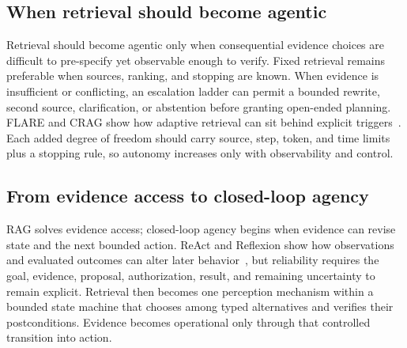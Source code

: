 \subsection{When retrieval should become agentic}

Retrieval should become agentic only when consequential evidence choices are difficult to pre-specify yet observable enough to verify. Fixed retrieval remains preferable when sources, ranking, and stopping are known. When evidence is insufficient or conflicting, an escalation ladder can permit a bounded rewrite, second source, clarification, or abstention before granting open-ended planning. FLARE and CRAG show how adaptive retrieval can sit behind explicit triggers~\cite{jiang2023flare,yan2024crag}. Each added degree of freedom should carry source, step, token, and time limits plus a stopping rule, so autonomy increases only with observability and control.

\subsection{From evidence access to closed-loop agency}

RAG solves evidence access; closed-loop agency begins when evidence can revise state and the next bounded action. ReAct and Reflexion show how observations and evaluated outcomes can alter later behavior~\cite{yao2023react,shinn2023reflexion}, but reliability requires the goal, evidence, proposal, authorization, result, and remaining uncertainty to remain explicit. Retrieval then becomes one perception mechanism within a bounded state machine that chooses among typed alternatives and verifies their postconditions. Evidence becomes operational only through that controlled transition into action.

